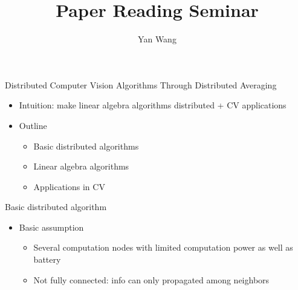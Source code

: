\documentclass[12pt]{beamer}
\author{Yan Wang}
\title{Paper Reading Seminar}
\subtitle{}
\begin{document}
\begin{frame}[plain]
    \titlepage
\end{frame}

\begin{frame}{Distributed Computer Vision Algorithms Through Distributed Averaging}
    \begin{itemize}
        \item Intuition: make linear algebra algorithms distributed + CV applications
        \item Outline
        \begin{itemize}
            \item Basic distributed algorithms
            \item Linear algebra algorithms
            \item Applications in CV
        \end{itemize}
    \end{itemize}
\end{frame}

\begin{frame}{Basic distributed algorithm}
    \begin{itemize}
        \item Basic assumption
        \begin{itemize}
            \item Several computation nodes with limited computation power as well as battery
            \item Not fully connected: info can only propagated among neighbors
            \\  
        \end{itemize}
    \end{itemize}
\end{frame}
\end{document}

